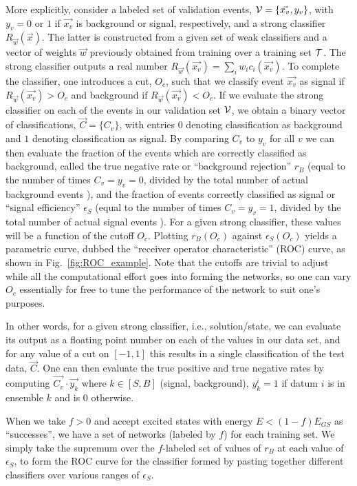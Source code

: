 More explicitly, consider a labeled set of validation events, $\mathcal{V}=\{\vec{x_v},y_v\}$, with $y_v=0$ or $1$ if $\vec{x_v}$ is background or signal, respectively, and a strong classifier $R_{\vec{w}}(\vec{x})$. The latter is constructed from a given set of weak classifiers and a vector of weights $\vec{w}$ previously obtained from training over a training set $\mathcal{T}$. The strong classifier outputs a real number $R_{\vec{w}}(\vec{x_v})=\sum_i w_i c_i(\vec{x_v})$. To complete the classifier, one introduces a cut, $O_c$, such that we classify event $\vec{x_v}$ as signal if $R_{\vec{w}}(\vec{x_v})>O_c$ and background if $R_{\vec{w}}(\vec{x_v})<O_c$. If we evaluate the strong classifier on each of the events in our validation set $\mathcal{V}$, we obtain a binary vector of classifications, $\vec{C}=\{C_v\}$, with entries $0$ denoting classification as background and $1$ denoting classification as signal. By comparing $C_v$ to $y_v$ for all $v$ we can then evaluate the fraction of the events which are correctly classified as background, called the true negative rate or ``background rejection'' $r_B$ (equal to the number of times $C_v=y_v=0$, divided by the total number of actual background events
%
),
and the fraction of events correctly classified as signal or ``signal efficiency'' $\epsilon_S$ (equal to the number of times $C_v=y_v=1$, divided by the total number of actual signal events%
).
For a given strong classifier, these values will be a function of the cutoff $O_c$. Plotting $r_B(O_c)$ against $\epsilon_S(O_c)$ yields a parametric curve, dubbed the ``receiver operator characteristic'' (ROC) curve, as shown in Fig.~\ref{fig:ROC_example}. Note that the cutoffs are trivial to adjust while all the computational effort goes into forming the networks, so one can vary $O_c$ essentially for free to tune the performance of the network to suit one's purposes.

In other words, for a given strong classifier, i.e., solution/state, we can evaluate its output as a floating point number on each of the values in our data set, and for any value of a cut on $[-1,1]$ this results in a single classification of the test data, $\vec{C}$. One can then evaluate the true positive and true negative rates by computing $\vec{C_v}\cdot\vec{y_k}$ where $k\in [S,B]$ (signal, background), $y_k^i=1$ if datum $i$ is in ensemble $k$ and is $0$ otherwise.

When we take $f>0$ and accept excited states with energy $E<(1-f)E_{GS}$  as ``successes'', we have a set of networks (labeled by $f$) for each training set. We simply take the supremum over the $f$-labeled set of values of $r_B$ at each value of $\epsilon_S$, to form the ROC curve for the classifier formed by pasting together different classifiers over various ranges of $\epsilon_S$.

